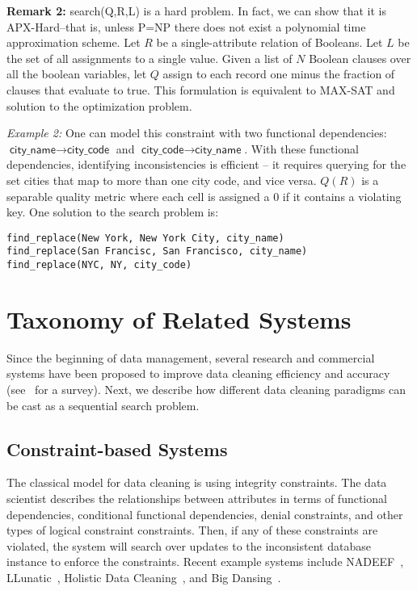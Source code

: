 \vspace{0.5em} \noindent \textbf{Remark 2: } \textsf{search(Q,R,L)} is a hard problem. In fact, we can show that it is APX-Hard--that is, unless P=NP there does not exist a polynomial time approximation scheme.
Let $R$ be a single-attribute relation of Booleans. Let $L$ be the set of all assignments to a single value.
Given a list of $N$ Boolean clauses over all the boolean variables, let $Q$ assign to each record one minus the fraction of clauses that evaluate to true. This formulation is equivalent to MAX-SAT and solution to the optimization problem.


\vspace{0.5em} \noindent \emph{Example 2: } 
One can model this constraint with two functional dependencies: $\textsf{city\_name} \rightarrow \textsf{city\_code}$ and $\textsf{city\_code} \rightarrow \textsf{city\_name}$.
With these functional dependencies, identifying inconsistencies is efficient -- it requires querying for the set cities that map to more than one city code, and vice versa. 
$Q(R)$ is a separable quality metric where each cell is assigned a 0  if it contains a violating key. One solution to the search problem is:
\begin{lstlisting}
find_replace(New York, New York City, city_name)
find_replace(San Francisc, San Francisco, city_name)
find_replace(NYC, NY, city_code)
\end{lstlisting}

\section{Taxonomy of Related Systems}
Since the beginning of data management, several research and commercial systems have been proposed to improve data cleaning efficiency and accuracy (see~\cite{rahm2000data} for a survey).
Next, we describe how different data cleaning paradigms can be cast as a sequential search problem.

\subsection{Constraint-based Systems}
The classical model for data cleaning is using integrity constraints. 
The data scientist describes the relationships between attributes in terms of functional dependencies, conditional functional dependencies, denial constraints, and other types of logical constraint constraints.
Then, if any of these constraints are violated, the system will search over updates to the inconsistent database instance to enforce the constraints.
Recent example systems include NADEEF~\cite{DBLP:conf/sigmod/DallachiesaEEEIOT13}, LLunatic~\cite{geerts2013llunatic}, Holistic Data Cleaning~\cite{chu2013holistic}, and Big Dansing~\cite{khayyat2015bigdansing}.

